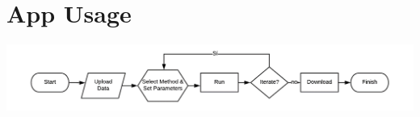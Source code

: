 \section{App Usage}

\begin{center}
\includegraphics[width=\columnwidth]{./images/appUsageHorizontal.png}
\end{center}

